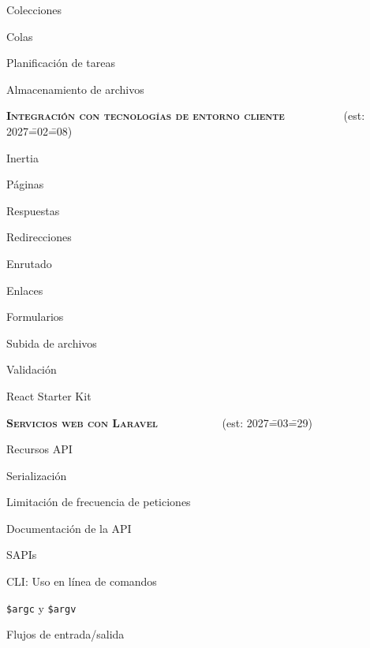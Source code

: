 \begin{longenum}
\begin{longenum}
        \item Colecciones
        \item Colas
        \item Planificación de tareas
        \item Almacenamiento de archivos
    \end{longenum}
    \item \textbf{\textsc{Integración con tecnologías de entorno cliente}} \ \ \ \ \ \ \ \dual\ \ \ (est: 2027\==02\==08)
    \begin{longenum}
        \item Inertia
        \begin{longenum}
            \item Páginas
            \item Respuestas
            \item Redirecciones
            \item Enrutado
            \item Enlaces
            \item Formularios
            \item Subida de archivos
            \item Validación
        \end{longenum}
        \item React Starter Kit
    \end{longenum}
    \item \textbf{\textsc{Servicios web con Laravel}} \ \ \ \ \ \ \ \ \dual\ \ \ (est: 2027\==03\==29)
    \begin{longenum}
        \item Recursos API
        \item Serialización
        \item Limitación de frecuencia de peticiones
        \item Documentación de la API
    \end{longenum}
    \item SAPIs \opcional\
    \begin{longenum}
        \item CLI: Uso en línea de comandos
        \begin{longenum}
            \item \texttt{\$argc} y \texttt{\$argv}
            \item Flujos de entrada/salida \opcional\
        \end{longenum}

\end{longenum}
\end{longenum}
